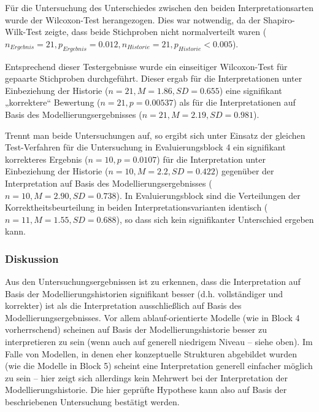 Für die Untersuchung des Unterschiedes zwischen den beiden Interpretationsarten wurde der Wilcoxon-Test herangezogen. Dies war notwendig, da der Shapiro-Wilk-Test zeigte, dass beide Stichproben nicht normalverteilt waren ($n_{Ergebnis}=21, p_{Ergebnis}=0.012, n_{Historie}=21, p_{Historie}<0.005$).

Entsprechend dieser Testergebnisse wurde ein einseitiger Wilcoxon-Test für gepaarte Stichproben durchgeführt. Dieser ergab für die Interpretationen unter Einbeziehung der Historie ($n=21, M=1.86, SD=0.655$) eine signifikant „korrektere“ Bewertung ($n=21, p=0.00537$) als für die Interpretationen auf Basis des Modellierungsergebnisses ($n=21, M=2.19, SD=0.981$).

Trennt man beide Untersuchungen auf, so ergibt sich unter Einsatz der gleichen Test-Verfahren für die Untersuchung in Evaluierungsblock 4 ein signifikant korrekteres Ergebnis ($n=10, p=0.0107$) für die Interpretation unter Einbeziehung der Historie ($n=10, M=2.2, SD=0.422$) gegenüber der Interpretation auf Basis des Modellierungsergebnisses ($n=10, M=2.90, SD=0.738$). In Evaluierungsblock sind die Verteilungen der Korrektheitsbeurteilung in beiden Interpretationsvarianten identisch ($n=11, M=1.55, SD=0.688$), so dass sich kein signifikanter Unterschied ergeben kann.

\subsubsection{Diskussion} 

Aus den Untersuchungsergebnissen ist zu erkennen, dass die Interpretation auf Basis der Modellierungshistorien signifikant besser (d.h. vollständiger und korrekter) ist als die Interpretation ausschließlich auf Basis des Modellierungsergebnisses. Vor allem ablauf-orientierte Modelle (wie in Block 4 vorherrschend) scheinen auf Basis der Modellierungshistorie besser zu interpretieren zu sein (wenn auch auf generell niedrigem Niveau -- siehe oben). Im Falle von Modellen, in denen eher konzeptuelle Strukturen abgebildet wurden (wie die Modelle in Block 5) scheint eine Interpretation generell einfacher möglich zu sein -- hier zeigt sich allerdings kein Mehrwert bei der Interpretation der Modellierungshistorie. Die hier geprüfte Hypothese kann also auf Basis der beschriebenen Untersuchung bestätigt werden.


